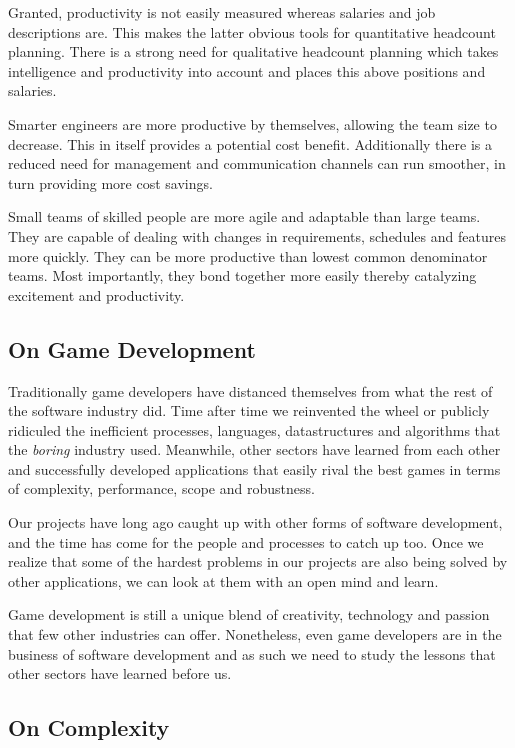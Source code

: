 \documentclass[twocolumn]{paper}
\begin{document}
Granted, productivity is not easily measured whereas salaries and
job descriptions are. This makes the latter obvious tools for
quantitative headcount planning. There is a strong need for
qualitative headcount planning which takes intelligence and
productivity into account and places this above positions and
salaries.

Smarter engineers are more productive by themselves, allowing the
team size to decrease. This in itself provides a potential cost
benefit. Additionally there is a reduced need for management and
communication channels can run smoother, in turn providing more cost
savings.

Small teams of skilled people are more agile and adaptable than
large teams. They are capable of dealing with changes in
requirements, schedules and features more quickly. They can be more
productive than lowest common denominator teams. Most importantly,
they bond together more easily thereby catalyzing excitement and
productivity.

\subsection{On Game Development}

Traditionally game developers have distanced themselves from what
the rest of the software industry did. Time after time we reinvented
the wheel or publicly ridiculed the inefficient processes,
languages, datastructures and algorithms that the \emph{boring}
industry used. Meanwhile, other sectors have learned from each other
and successfully developed applications that easily rival the best
games in terms of complexity, performance, scope and robustness.

Our projects have long ago caught up with other forms of software
development, and the time has come for the people and processes to
catch up too. Once we realize that some of the hardest problems in
our projects are also being solved by other applications, we can
look at them with an open mind and learn.

Game development is still a unique blend of creativity, technology
and passion that few other industries can offer. Nonetheless, even
game developers are in the business of software development and as
such we need to study the lessons that other sectors have learned
before us.

\subsection{On Complexity}
\end{document}
